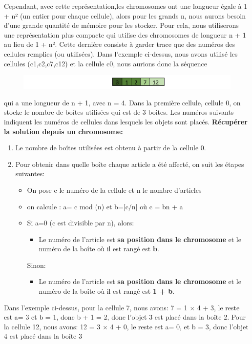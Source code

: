 \documentclass{article}
\begin{document}
Cependant, avec cette représentation,les chromosomes ont une longueur égale à 1 + n² (un entier pour chaque cellule), alors pour les grands n, nous aurons besoin d'une grande quantité de mémoire pour les stocker.
Pour cela, nous utiliserons une représentation plus compacte qui utilise des chromosomes de longueur n + 1 au lieu de 1 + n². Cette dernière consiste à garder trace que des numéros des cellules remplies (ou utilisées).
\newline
Dans l'exemple ci-dessus, nous avons utilisé les cellules (c1,c2,c7,c12) et la cellule c0, nous aurions donc la séquence 
\begin{figure}[H]
  \includegraphics[width=\linewidth]{../figures/pic03.PNG}
\end{figure}
qui a une longueur de n + 1, avec n = 4. 
\newline
\newline
Dans la première cellule, cellule 0, on stocke le nombre de boîtes utilisées qui est de  3 boites. Les numéros suivants indiquent les numéros de cellules dans lesquels les objets sont placés.
\newline
\newline
\textbf{Récupérer la solution depuis un chromosome: }
\begin{enumerate}
	\item Le nombre de boîtes utilisées est obtenu à partir de la cellule 0. 
	\item Pour obtenir dans quelle boîte chaque article a été affecté, on suit les étapes suivantes: 
	\begin{itemize}
		\item On pose c le numéro de la cellule et n le nombre d’articles
		\item on calcule : a= c mod (n) et b=[c/n] où c = bn + a
		\item  Si a=0  (c est divisible par n), alors: 
		\begin{itemize}
			\item Le numéro de l’article est\textbf{ sa position dans le chromosome} et le numéro de la boîte où il est rangé  est \textbf{b}.
		\end{itemize}
		Sinon:
		\begin{itemize}
			\item Le numéro de l’article est \textbf{sa position dans le chromosome} et le numéro de la boîte où il est rangé est \textbf{1 + b}.
		\end{itemize}
	\end{itemize}
\end{enumerate}
Dans l'exemple ci-dessus, pour la cellule 7, nous avons: 7 = 1 × 4 + 3, 
le reste est a= 3 et b = 1, donc b + 1 = 2, donc l'objet 3 est placé dans la boîte 2. 
Pour la cellule 12, nous avons: 12 = 3 × 4 + 0, le reste est a= 0, et b = 3, donc l'objet 4 est placé dans la boîte 3
\end{document}
